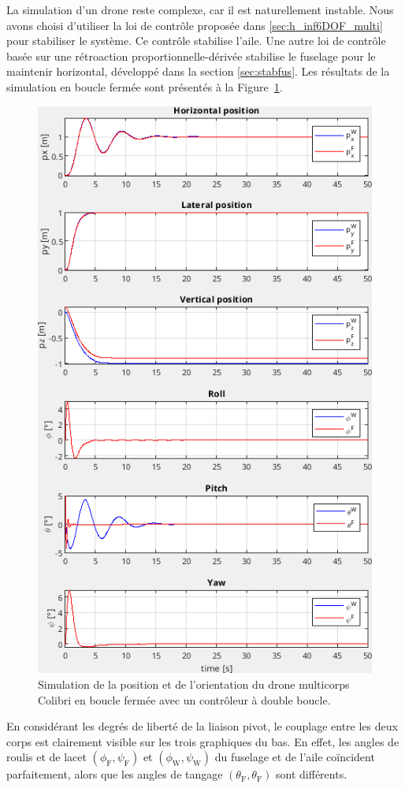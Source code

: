 La simulation d'un drone reste complexe, car il est naturellement instable. Nous avons choisi d'utiliser la loi de contrôle proposée dans \ref{sec:h_inf6DOF_multi} pour stabiliser le système. Ce contrôle stabilise l'aile. Une autre loi de contrôle basée sur une rétroaction proportionnelle-dérivée stabilise le fuselage pour le maintenir horizontal, développé dans la section \ref{sec:stabfus}. Les résultats de la simulation en boucle fermée sont présentés à la Figure~\ref{fig:sim_colibri}.

\begin{figure}[ht!]
\centering
    \includegraphics[width=0.6\columnwidth,angle=0]{figures/colibri_sim.png}
    \caption{Simulation de la position et de l'orientation du drone multicorps Colibri en boucle fermée avec un contrôleur à double boucle. }
    \label{fig:sim_colibri}
\end{figure}

En considérant les degrés de liberté de la liaison pivot, le couplage entre les deux corps est clairement visible sur les trois graphiques du bas. En effet, les angles de roulis et de lacet $(\phi_{\text{F}}, \psi_{\text{F}})$ et $(\phi_{\text{W}}, \psi_{\text{W}})$ du fuselage et de l'aile coïncident parfaitement, alors que les angles de tangage $(\theta_{\text{F}}, \theta_{\text{F}})$ sont différents.

